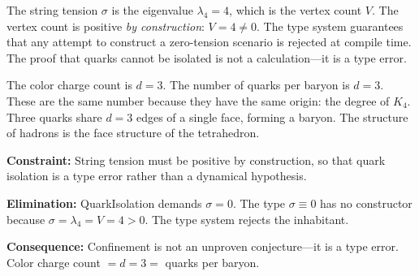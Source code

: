 \documentclass[11pt,a4paper]{book}
\def\texttt#1{#1}%
\begin{document}
The string tension $\sigma$ is the eigenvalue $\lambda_4 = 4$, which is the vertex count $V$. The vertex count is positive \emph{by construction}: $V = 4 \neq 0$. The type system guarantees that any attempt to construct a zero-tension scenario is rejected at compile time. The proof that quarks cannot be isolated is not a calculation---it is a type error.

The color charge count is $d = 3$. The number of quarks per baryon is $d = 3$. These are the same number because they have the same origin: the degree of $K_4$. Three quarks share $d = 3$ edges of a single face, forming a baryon. The structure of hadrons is the face structure of the tetrahedron.

\textbf{Constraint:} String tension must be positive by construction, so that quark isolation is a type error rather than a dynamical hypothesis.

\textbf{Elimination:} \texttt{QuarkIsolation} demands $\sigma = 0$. The type $\sigma \equiv 0$ has no constructor because $\sigma = \lambda_4 = V = 4 > 0$. The type system rejects the inhabitant.

\textbf{Consequence:} Confinement is not an unproven conjecture---it is a type error. Color charge count $= d = 3 =$ quarks per baryon.
\end{document}
